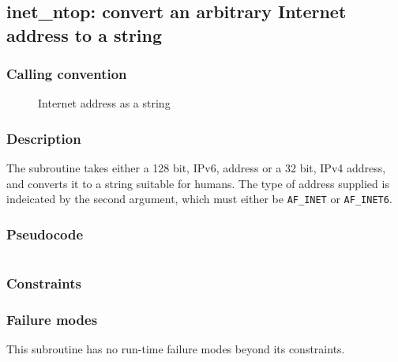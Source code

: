 \clearpage
{}
{}
\label{subr:inet-ntop}
\subsection*{inet\_ntop: convert an arbitrary Internet address to a string}

\subsubsection*{Calling convention}

\begin{description}
\item[] Internet address as a string
\end{description}

\subsubsection*{Description}

The  subroutine takes either a 128 bit, IPv6,
address or a 32 bit, IPv4 address, and converts it to a string
suitable for humans.  The type of address supplied is indeicated by
the second argument, which must either be \verb|AF_INET| or
\verb|AF_INET6|.

\subsubsection*{Pseudocode}

\begin{verbatim}
\end{verbatim}

\subsubsection*{Constraints}

\subsubsection*{Failure modes}

This subroutine has no run-time failure modes beyond its constraints.
